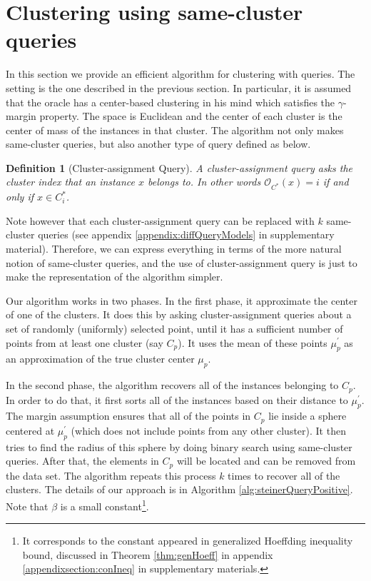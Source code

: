 \documentclass[12pt]{article}
\newcommand{\mc}{\mathcal}
\newtheorem{definition}[theorem]{Definition}
\begin{document}
\section{Clustering using same-cluster queries}
\label{section:clusteringWithQuery}

In this section we provide an efficient algorithm for clustering with queries. The setting is the one described in the previous section. In particular, it is assumed that the oracle has a center-based clustering in his mind which satisfies the $\gamma$-margin property. The space is Euclidean and the center of each cluster is the center of mass of the instances in that cluster. The algorithm not only makes same-cluster queries, but also another type of query defined as below.%


\begin{definition}[Cluster-assignment Query]
A cluster-assignment query asks the cluster index that an instance $x$ belongs to. In other words ${\mc O_{C^*}}(x) = i$ if and only if $x \in C^*_i$.
\end{definition}

Note however that each cluster-assignment query can be replaced with $k$ same-cluster queries (see appendix \ref{appendix:diffQueryModels} in supplementary material). Therefore, we can express everything in terms of the more natural notion of same-cluster queries, and the use of cluster-assignment query is just to make the representation of the algorithm simpler.

Our algorithm works in two phases. In the first phase, it approximate the center of one of the clusters. It does this by asking cluster-assignment queries about a set of randomly (uniformly) selected point, until it has a sufficient number of points from at least one cluster (say $C_p$). It uses the mean of these points $\mu_p^\prime$ as an approximation of the true cluster center $\mu_p$. 

In the second phase, the algorithm recovers all of the instances belonging to $C_p$. In order to do that, it first sorts all of the instances based on their distance to $\mu_p^\prime$. The margin assumption ensures that all of the points in $C_p$ lie inside a sphere centered at $\mu_p^\prime$ (which does not include points from any other cluster). It then tries to find the radius of this sphere by doing binary search using same-cluster queries. After that, the elements in $C_p$ will be located and can be removed from the data set. The algorithm repeats this process $k$ times to recover all of the clusters. The details of our approach is in Algorithm \ref{alg:steinerQueryPositive}. Note that $\beta$ is a small constant\footnote{It corresponds to the constant appeared in generalized Hoeffding inequality bound, discussed in Theorem \ref{thm:genHoeff} in appendix \ref{appendixsection:conIneq} in supplementary materials.}. 
\end{document}
